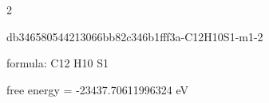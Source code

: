\documentclass{article}
\begin{document}
2

\vspace{1cm}


db346580544213066bb82c346b1fff3a-C12H10S1-m1-2



formula: C12 H10 S1



free energy = -23437.70611996324 eV
\end{document}
